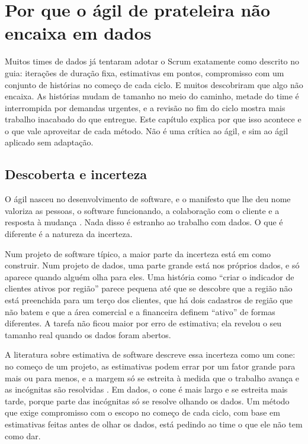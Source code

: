 \chapter{Por que o ágil de prateleira não encaixa em dados}
\label{cap:agil-prateleira}

Muitos times de dados já tentaram adotar o Scrum exatamente como descrito no guia: iterações
de duração fixa, estimativas em pontos, compromisso com um conjunto de histórias no começo de
cada ciclo. E muitos descobriram que algo não encaixa. As histórias mudam de tamanho no meio do
caminho, metade do time é interrompida por demandas urgentes, e a revisão no fim do ciclo
mostra mais trabalho inacabado do que entregue. Este capítulo explica por que isso acontece e
o que vale aproveitar de cada método. Não é uma crítica ao ágil, e sim ao ágil aplicado sem
adaptação.

\section{Descoberta e incerteza}
\label{sec:descoberta}

O ágil nasceu no desenvolvimento de software, e o manifesto que lhe deu nome valoriza as
pessoas, o software funcionando, a colaboração com o cliente e a resposta à mudança
\parencite{agilemanifesto2001}. Nada disso é estranho ao trabalho com dados. O que é diferente
é a natureza da incerteza.

Num projeto de software típico, a maior parte da incerteza está em como construir. Num projeto
de dados, uma parte grande está nos próprios dados, e só aparece quando alguém olha para eles.
Uma história como \enquote{criar o indicador de clientes ativos por região} parece pequena até
que se descobre que a região não está preenchida para um terço dos clientes, que há dois
cadastros de região que não batem e que a área comercial e a financeira definem
\enquote{ativo} de formas diferentes. A tarefa não ficou maior por erro de estimativa; ela
revelou o seu tamanho real quando os dados foram abertos.

A literatura sobre estimativa de software descreve essa incerteza como um cone: no começo de
um projeto, as estimativas podem errar por um fator grande para mais ou para menos, e a margem
só se estreita à medida que o trabalho avança e as incógnitas são resolvidas
\parencite{mcconnell2006}. Em dados, o cone é mais largo e se estreita mais tarde, porque
parte das incógnitas só se resolve olhando os dados. Um método que exige compromisso com o
escopo no começo de cada ciclo, com base em estimativas feitas antes de olhar os dados, está
pedindo ao time o que ele não tem como dar.


